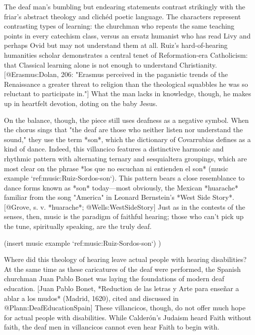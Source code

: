 The deaf man's bumbling but endearing statements contrast strikingly with the
friar's abstract theology and clichéd poetic language. 
The characters represent contrasting types of learning: the churchman who
repeats the same teaching points in every catechism class, versus an ersatz
humanist who has read Livy and perhaps Ovid but may not understand them at all.
Ruiz's hard-of-hearing humanities scholar demonstrates a central tenet of
Reformation-era Catholicism: that Classical learning alone is not enough to
understand Christianity.
[@Erasmus:Dolan, 206: "Erasmus perceived in the paganistic trends of the
Renaissance a greater threat to religion than the theological squabbles he was
so reluctant to participate in."]
What the man lacks in knowledge, though, he makes up in heartfelt devotion,
doting on the baby Jesus.

On the balance, though, the piece still uses deafness as a negative symbol.
When the chorus sings that "the deaf are those who neither listen nor understand
the sound," they use the term *son*, which the dictionary of Covarrubias defines
as a kind of dance.
Indeed, this villancico features a distinctive harmonic and rhythmic pattern
with alternating ternary and sesquialtera groupings, which are most clear on the
phrase *los que no escuchan ni entienden el son*
(music example `ref:music:Ruiz-Sordos-son`).
This pattern bears a close resemblance to dance forms known as *son*
today---most obviously, the Mexican *huarache* familiar from the song "America"
in Leonard Bernstein's *West Side Story*.
[@Grove, s. v. *huarache*; @Wells:WestSideStory]
Just as in the contests of the senses, then, music is the paradigm of faithful
hearing; those who can't pick up the tune, spiritually speaking, are the truly
deaf.

(insert music example `ref:music:Ruiz-Sordos-son`)
\label{music:Ruiz-Sordos-son})

Where did this theology of hearing leave actual people with hearing
disabilities?
At the same time as these caricatures of the deaf were performed, the Spanish
churchman Juan Pablo Bonet was laying the foundations of modern deaf education.
[Juan Pablo Bonet, *Reduction de las letras y Arte para enseñar a ablar a los
mudos* (Madrid, 1620), cited and discussed in @Plann:DeafEducationSpain] 
These villancicos, though, do not offer much hope for actual people with
disabilities.
While Calderón's Judaism heard Faith without faith, the deaf men in villancicos
cannot even hear Faith to begin with. 

